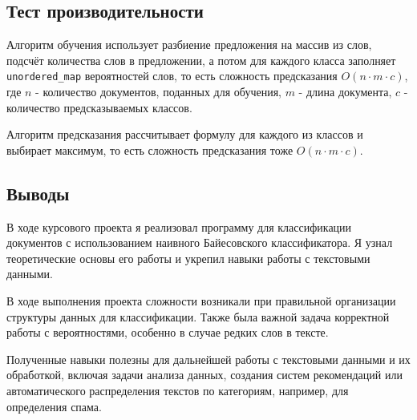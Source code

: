 \documentclass[12pt]{article}
\begin{document}
\newpage
\subsection*{Тест производительности}

Алгоритм обучения использует разбиение предложения на массив из слов, подсчёт количества слов в предложении, а потом для каждого класса
заполняет \texttt{unordered\_map} вероятностей слов, то есть сложность предсказания $O(n \cdot m \cdot c)$, где $n$ - количество документов,
поданных для обучения, $m$ - длина документа, $c$ - количество предсказываемых классов.

Алгоритм предсказания рассчитывает формулу для каждого из классов и выбирает максимум, то есть сложность предсказания тоже $O(n \cdot m \cdot c)$.

\subsection*{Выводы}

В ходе курсового проекта я реализовал программу для классификации документов
с использованием наивного Байесовского классификатора.
Я узнал теоретические основы его работы и укрепил
навыки работы с текстовыми данными. 

В ходе выполнения проекта сложности возникали при правильной организации
структуры данных для классификации. Также была важной задача корректной работы
с вероятностями, особенно в случае редких слов в тексте.

Полученные навыки полезны для дальнейшей работы с текстовыми данными
и их обработкой, включая задачи анализа данных, создания систем рекомендаций
или автоматического распределения текстов по категориям, например, для определения спама.
\end{document}
